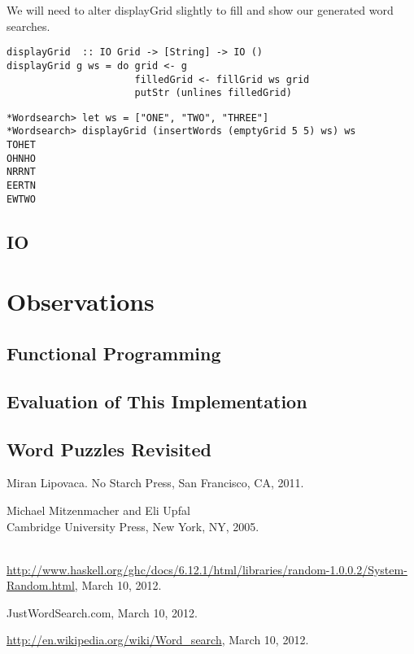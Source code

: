 \documentclass[12pt]{report}   %
\begin{document}
    \vspace{12pt}

    We will need to alter displayGrid slightly to fill and show our generated
    word searches.

    \vspace {12pt}

    \begin{lstlisting}
displayGrid  :: IO Grid -> [String] -> IO ()
displayGrid g ws = do grid <- g
                      filledGrid <- fillGrid ws grid
                      putStr (unlines filledGrid)
    \end{lstlisting}

    \pagebreak

    \begin{lstlisting}
*Wordsearch> let ws = ["ONE", "TWO", "THREE"]
*Wordsearch> displayGrid (insertWords (emptyGrid 5 5) ws) ws
TOHET
OHNHO
NRRNT
EERTN
EWTWO
    \end{lstlisting}


\section*{IO}

\chapter*{Observations}
\section*{Functional Programming}
\section*{Evaluation of This Implementation}
\section*{Word Puzzles Revisited}

\begin{thebibliography}{9}
        Miran Lipovaca.
        \newblock No Starch Press, San Francisco, CA, 2011.

        Michael Mitzenmacher and Eli Upfal
         \\
        \newblock Cambridge University Press, New York, NY, 2005.

         \\
        \newblock \url{http://www.haskell.org/ghc/docs/6.12.1/html/libraries/random-1.0.0.2/System-Random.html}, March 10, 2012.

        \newblock JustWordSearch.com, March 10, 2012.

        \newblock \url{http://en.wikipedia.org/wiki/Word_search}, March 10, 2012.

\end{thebibliography}
\end{document}
